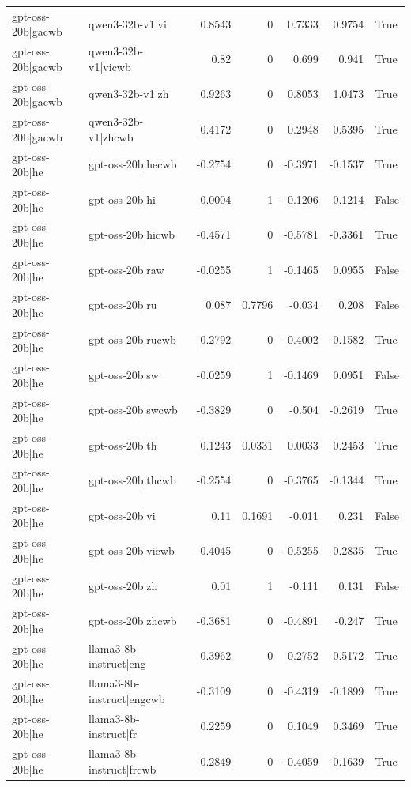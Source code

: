 \begin{table}
\begin{tabular}{l l r r r r l}
gpt-oss-20b|gacwb & qwen3-32b-v1|vi & 0.8543 & 0 & 0.7333 & 0.9754 & True \\
gpt-oss-20b|gacwb & qwen3-32b-v1|vicwb & 0.82 & 0 & 0.699 & 0.941 & True \\
gpt-oss-20b|gacwb & qwen3-32b-v1|zh & 0.9263 & 0 & 0.8053 & 1.0473 & True \\
gpt-oss-20b|gacwb & qwen3-32b-v1|zhcwb & 0.4172 & 0 & 0.2948 & 0.5395 & True \\
gpt-oss-20b|he & gpt-oss-20b|hecwb & -0.2754 & 0 & -0.3971 & -0.1537 & True \\
gpt-oss-20b|he & gpt-oss-20b|hi & 0.0004 & 1 & -0.1206 & 0.1214 & False \\
gpt-oss-20b|he & gpt-oss-20b|hicwb & -0.4571 & 0 & -0.5781 & -0.3361 & True \\
gpt-oss-20b|he & gpt-oss-20b|raw & -0.0255 & 1 & -0.1465 & 0.0955 & False \\
gpt-oss-20b|he & gpt-oss-20b|ru & 0.087 & 0.7796 & -0.034 & 0.208 & False \\
gpt-oss-20b|he & gpt-oss-20b|rucwb & -0.2792 & 0 & -0.4002 & -0.1582 & True \\
gpt-oss-20b|he & gpt-oss-20b|sw & -0.0259 & 1 & -0.1469 & 0.0951 & False \\
gpt-oss-20b|he & gpt-oss-20b|swcwb & -0.3829 & 0 & -0.504 & -0.2619 & True \\
gpt-oss-20b|he & gpt-oss-20b|th & 0.1243 & 0.0331 & 0.0033 & 0.2453 & True \\
gpt-oss-20b|he & gpt-oss-20b|thcwb & -0.2554 & 0 & -0.3765 & -0.1344 & True \\
gpt-oss-20b|he & gpt-oss-20b|vi & 0.11 & 0.1691 & -0.011 & 0.231 & False \\
gpt-oss-20b|he & gpt-oss-20b|vicwb & -0.4045 & 0 & -0.5255 & -0.2835 & True \\
gpt-oss-20b|he & gpt-oss-20b|zh & 0.01 & 1 & -0.111 & 0.131 & False \\
gpt-oss-20b|he & gpt-oss-20b|zhcwb & -0.3681 & 0 & -0.4891 & -0.247 & True \\
gpt-oss-20b|he & llama3-8b-instruct|eng & 0.3962 & 0 & 0.2752 & 0.5172 & True \\
gpt-oss-20b|he & llama3-8b-instruct|engcwb & -0.3109 & 0 & -0.4319 & -0.1899 & True \\
gpt-oss-20b|he & llama3-8b-instruct|fr & 0.2259 & 0 & 0.1049 & 0.3469 & True \\
gpt-oss-20b|he & llama3-8b-instruct|frcwb & -0.2849 & 0 & -0.4059 & -0.1639 & True \\

\end{tabular}
\end{table}

